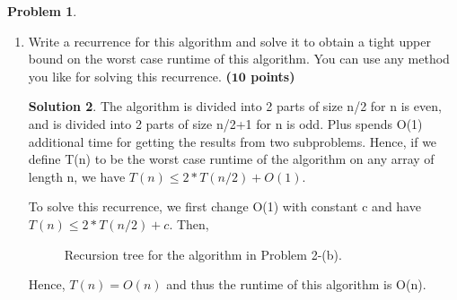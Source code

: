 \documentclass{article}
\theoremstyle{definition}
\newtheorem{problem}{Problem}
\newtheorem*{solution*}{Solution}
\newenvironment{solution}{\begin{solution*}}{{} \end{solution*}}
\newcommand{\grade}[1]{\hfill{\textbf{($\mathbf{#1}$ points)}}}
\begin{document}
\begin{problem}
\begin{enumerate}[label=(\alph*)]
\begin{solution}
	Therefore, it is correct for the case n+1. This concludes the proof of induction hypothesis. \\
	
	The correctness of the algorithm now follows directly from the induction hypothesis. \\
		
	\end{solution}


		\newpage
		\item Write a recurrence for this algorithm and solve it to obtain a tight upper bound on the worst case runtime of this algorithm. You can use any method you like for solving this recurrence. 		\grade{10}
	\bigskip	
	
	\begin{solution}
	
	The algorithm is divided into 2 parts of size n/2 for n is even, and is divided into 2 parts of size n/2+1 for n is odd. Plus spends O(1) additional time for getting the results from two subproblems. Hence, if we define T(n) to be the 		worst case runtime of the algorithm on any array of length n, we have $T(n) \leq 2*T(n / 2) + O(1)$.
	
	To solve this recurrence, we first change O(1) with constant c and have $T(n) \leq 2*T(n / 2) + c$. Then, 
	
	\begin{figure}[h!]
			\centering
		\caption{Recursion tree for the algorithm in Problem 2-(b).} 
	\end{figure}
	
	Hence, $T(n) = O(n)$ and thus the runtime of this algorithm is O(n). \\
	
\end{solution}


	\end{enumerate}
\end{problem} 
\end{document}
